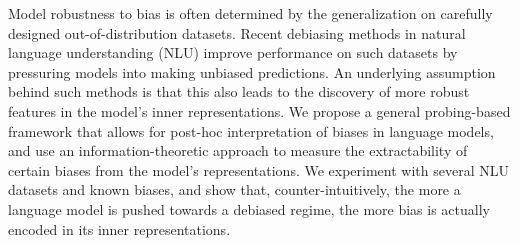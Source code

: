 Model robustness to bias is often determined by the generalization on carefully designed out-of-distribution datasets. Recent debiasing methods in natural language understanding (NLU) improve performance on such datasets by pressuring models into making unbiased predictions. An underlying assumption behind such methods is that this also leads to the discovery of more robust features in the model's inner representations. We propose a general probing-based framework that allows for post-hoc interpretation of biases in language models, and use an information-theoretic approach to measure the extractability of certain biases from the model's representations. We experiment with several NLU datasets and known biases, and show that, counter-intuitively, the more a language model is pushed towards a debiased regime, the more bias is actually encoded in its inner representations.
